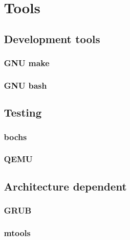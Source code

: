 
%
%

\chapter{Tools}

\newpage

\section{Development tools}
\subsection*{GNU make}
\subsection*{GNU bash}

\section{Testing}
\subsection*{bochs}
\subsection*{QEMU}

\section{Architecture dependent}
\subsection*{GRUB}
\subsection*{mtools}

